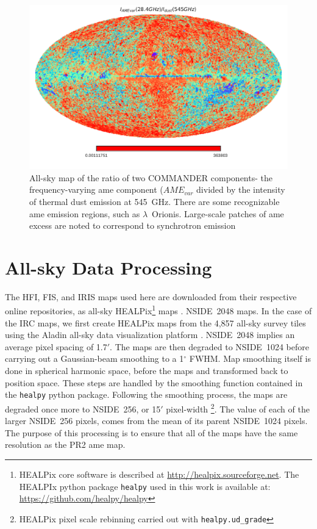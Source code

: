           \begin{figure}
               \centering
               \includegraphics[width=\textwidth]{../Plots/ch_datasources/R_PCAMEtoPCRad.pdf}
               \caption{All-sky map of the ratio of two COMMANDER components- the frequency-varying \acrshort{ame} component ($AME_{var}$ divided by the intensity of thermal dust emission at 545~GHz. There are some recognizable \acrshort{ame} emission regions, such as $\lambda$~Orionis. Large-scale patches of \acrshort{ame} excess are noted to correspond to synchrotron emission \citep{hensley16}}
               \label{fig:R_PCAMEtoPCdust}
           \end{figure}

  \section{All-sky Data Processing}

        The HFI, FIS, and IRIS maps used here are downloaded from their respective online repositories, as all-sky HEALPix\footnote{HEALPix core software is described at \url{http://healpix.sourceforge.net}. The HEALPIx python package {\tt healpy} used in this work is available at: \url{https://github.com/healpy/healpy}} maps \citep{gorski05}. NSIDE~2048 maps. In the case of the IRC maps, we first create HEALPix maps from the 4,857 all-sky survey tiles using the Aladin all-sky data visualization platform \citep{bonnarel00}. NSIDE~2048 implies an average pixel spacing of 1.7$'$. The maps are then degraded to NSIDE~1024 before carrying out a Gaussian-beam smoothing to a 1$^{\circ}$ FWHM. Map smoothing itself is done in spherical harmonic space, before the maps and transformed back to position space. These steps are handled by the smoothing function contained in the {\tt healpy} python package. Following the smoothing process, the maps are degraded once more to NSIDE~256, or 15$'$ pixel-width \footnote{HEALPix pixel scale rebinning carried out with {\tt healpy.ud\_grade}}. The value of each of the larger NSIDE~256 pixels, comes from the mean of its parent NSIDE~1024 pixels. The purpose of this processing is to ensure that all of the maps have the same resolution as the PR2 \acrshort{ame} map.
